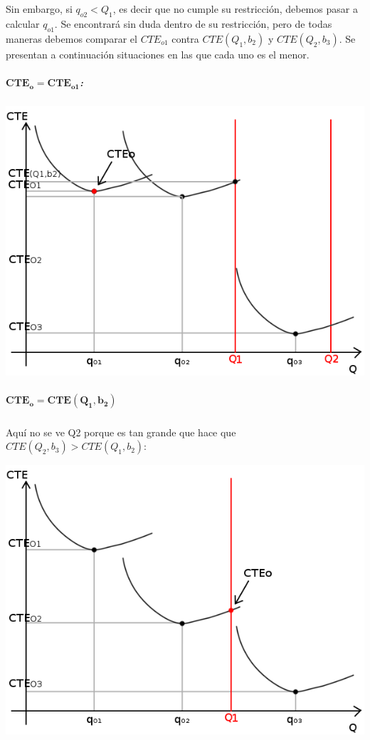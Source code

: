 \documentclass{article}
\begin{document}
	\subparagraph{} Sin embargo, si $q_{o2} < Q_1$, es decir que no cumple su restricción, debemos pasar a calcular $ q_{o1} $. Se encontrará sin duda dentro de su restricción, pero de todas maneras debemos comparar el $CTE_{o1}$ contra $CTE(Q_1, b_2)$ y $CTE(Q_2, b_3)$. Se presentan a continuación situaciones en las que cada uno es el menor.

	\subparagraph{$\mathbf{CTE_o = CTE_{o1}}$:}
	\begin{center}
	\includegraphics[scale=0.4,keepaspectratio=true]{img/6/6_CTE_1.png} 
	\end{center}

	\subparagraph{$\mathbf{CTE_o = CTE(Q_1, b_2)}$} Aquí no se ve Q2 porque es tan grande que hace que $CTE(Q_2, b_3) > CTE(Q_1, b_2)$:
	\begin{center}
	\includegraphics[scale=0.4,keepaspectratio=true]{img/6/6_CTE_Q1.png} 
	\end{center}
\end{document}
